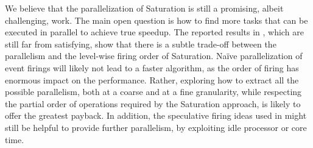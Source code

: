 \documentclass[copyright,creativecommons]{eptcs}
\begin{document}
We believe that the parallelization of Saturation is still a promising,
albeit challenging, work.
The main open question is how to find more tasks that
can be executed in parallel to achieve true speedup.
The reported results in \cite{2007CAV-Cilk}, which are still far from
satisfying, show that there is a subtle trade-off between the
parallelism and the level-wise firing order of Saturation.
Na\"ive parallelization of event firings will likely not lead to a faster
algorithm, as the order of firing has enormous impact on the performance.
Rather, exploring how to extract all the possible parallelism, both
at a coarse and at a fine granularity, while respecting the partial
order of operations required by the Saturation approach, is likely
to offer the greatest payback.
In addition, the speculative firing ideas used in
\cite{2005PDMC-FirePredict,2006IPDPS-Speculative,2009JLC-ImageSpeculation}
might still be helpful to provide further parallelism,
by exploiting idle processor or core time.


\end{document}
